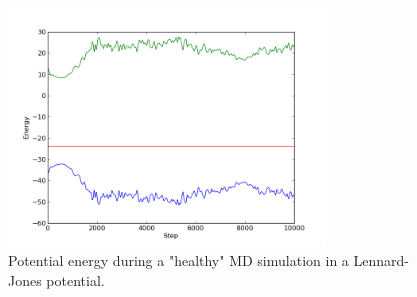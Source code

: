 \documentclass{article}
\begin{document}
\begin{figure}[htb]
  \centering
  \includegraphics[width=0.75\textwidth]{images/potential_energy.png}
  \caption{Potential energy during a "healthy" MD simulation in a Lennard-Jones potential.}
  \label{fig:potential_energy}
\end{figure}


% 
% 
% 
% 
% 


\end{document}
